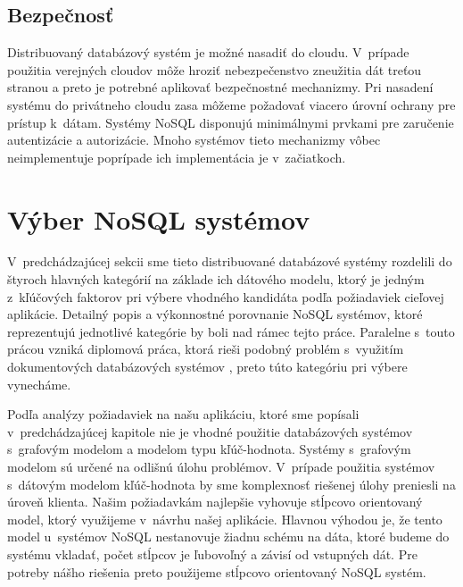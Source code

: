 \documentclass[11pt,twoside,a4paper]{book}
\begin{document}
\subsection{Bezpečnosť}
Distribuovaný databázový systém je možné nasadiť do cloudu. V~prípade použitia verejných cloudov môže hroziť nebezpečenstvo zneužitia dát treťou stranou a preto je potrebné aplikovať bezpečnostné mechanizmy. Pri nasadení systému do privátneho cloudu zasa môžeme požadovať viacero úrovní ochrany pre prístup k~dátam. Systémy NoSQL disponujú minimálnymi prvkami pre zaručenie autentizácie a autorizácie. Mnoho systémov tieto mechanizmy vôbec neimplementuje poprípade ich implementácia je v~začiatkoch.



\section{Výber NoSQL systémov}
V~predchádzajúcej sekcii sme tieto distribuované databázové systémy rozdelili do štyroch hlavných kategórií na základe ich dátového modelu, ktorý je jedným z~kľúčových faktorov pri výbere vhodného kandidáta podľa požiadaviek cieľovej aplikácie. Detailný popis a výkonnostné porovnanie NoSQL systémov, ktoré reprezentujú jednotlivé kategórie by boli nad rámec tejto práce. Paralelne s~touto prácou vzniká diplomová práca, ktorá rieši podobný problém s~využitím dokumentových databázových systémov  \cite{barina}, preto túto kategóriu pri výbere vynecháme.

Podľa analýzy požiadaviek na našu aplikáciu, ktoré sme popísali v~predchádzajúcej kapitole nie je vhodné použitie databázových systémov s~grafovým modelom a modelom typu kľúč-hodnota. Systémy s~grafovým modelom sú určené na odlišnú úlohu problémov. V~prípade použitia systémov s~dátovým modelom kľúč-hodnota by sme komplexnosť riešenej úlohy preniesli na úroveň klienta. Našim požiadavkám najlepšie vyhovuje stĺpcovo orientovaný model, ktorý využijeme v~návrhu našej aplikácie. Hlavnou výhodou je, že tento model u~systémov NoSQL nestanovuje žiadnu schému na dáta, ktoré budeme do systému vkladať, počet stĺpcov je ľubovoľný a závisí od vstupných dát. Pre potreby nášho riešenia preto použijeme stĺpcovo orientovaný NoSQL systém.
\end{document}
